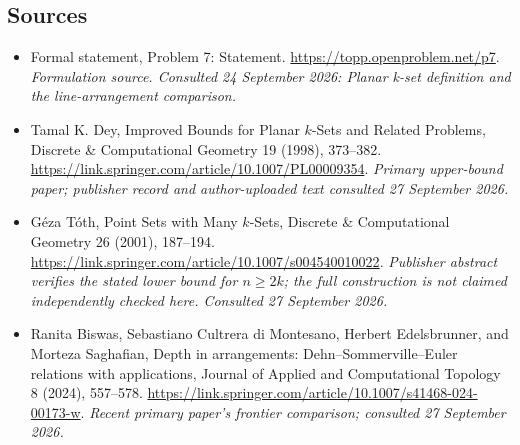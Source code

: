 \documentclass[11pt]{article}
\begin{document}
\subsection{Sources}
\begin{itemize}
\item[S1]Formal statement, Problem 7: Statement.
\url{https://topp.openproblem.net/p7}.
\textit{Formulation source. Consulted 24 September 2026: Planar k-set definition and the line-arrangement comparison.}
\item[E1]Tamal K. Dey, Improved Bounds for Planar $k$-Sets and Related
Problems, Discrete \& Computational Geometry 19 (1998), 373--382.
\url{https://link.springer.com/article/10.1007/PL00009354}.
\textit{Primary upper-bound paper; publisher record and author-uploaded
text consulted 27 September 2026.}
\item[E2]G\'eza T\'oth, Point Sets with Many $k$-Sets,
Discrete \& Computational Geometry 26 (2001), 187--194.
\url{https://link.springer.com/article/10.1007/s004540010022}.
\textit{Publisher abstract verifies the stated lower bound for $n\geq2k$;
the full construction is not claimed independently checked here.
Consulted 27 September 2026.}
\item[E3]Ranita Biswas, Sebastiano Cultrera di Montesano, Herbert
Edelsbrunner, and Morteza Saghafian, Depth in arrangements:
Dehn--Sommerville--Euler relations with applications,
Journal of Applied and Computational Topology 8 (2024), 557--578.
\url{https://link.springer.com/article/10.1007/s41468-024-00173-w}.
\textit{Recent primary paper's frontier comparison; consulted
27 September 2026.}
\end{itemize}
\end{document}
